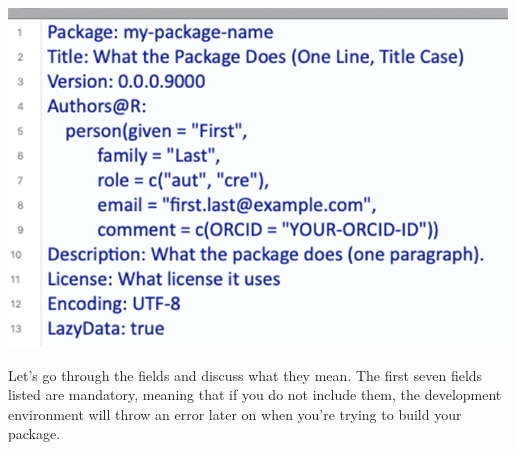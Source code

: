 \documentclass[
]{book}
\begin{document}
\includegraphics{images/packageSS/description_blank.png}

Let's go through the fields and discuss what they mean. The first seven fields listed are mandatory, meaning that if you do not include them, the development environment will throw an error later on when you're trying to build your package.
\end{document}
